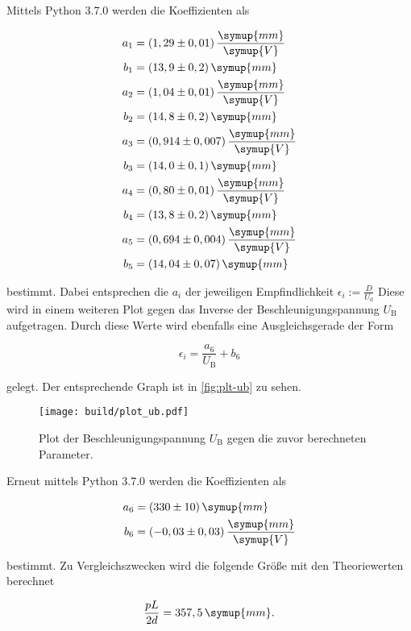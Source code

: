 Mittels Python 3.7.0 werden die Koeffizienten als

\begin{align*}
  a_1 &= (1,29 \pm 0,01) \, \frac{\symup{mm}}{\symup{V}} \\
  b_1 &= (13,9 \pm 0,2) \, \symup{mm} \\
  a_2 &= (1,04 \pm 0,01) \, \frac{\symup{mm}}{\symup{V}} \\
  b_2 &= (14,8 \pm 0,2) \, \symup{mm} \\
  a_3 &= (0,914 \pm 0,007) \, \frac{\symup{mm}}{\symup{V}} \\
  b_3 &= (14,0 \pm 0,1) \, \symup{mm} \\
  a_4 &= (0,80 \pm 0,01) \, \frac{\symup{mm}}{\symup{V}} \\
  b_4 &= (13,8 \pm 0,2) \, \symup{mm} \\
  a_5 &= (0,694 \pm 0,004) \, \frac{\symup{mm}}{\symup{V}} \\
  b_5 &= (14,04 \pm 0,07) \, \symup{mm}
\end{align*}

bestimmt. Dabei entsprechen die $a_i$ der jeweiligen Empfindlichkeit $\epsilon_i := \frac{D}{U_\text{d}}$
Diese wird in einem weiteren Plot gegen das Inverse der Beschleunigungspannung $U_\text{B}$ aufgetragen.
Durch diese Werte wird ebenfalls eine Ausgleichsgerade der Form

\begin{equation}
  \epsilon_i = \frac{a_6}{U_\text{B}} + b_6
\end{equation}

gelegt. Der entsprechende Graph ist in \autoref{fig:plt-ub} zu sehen.

\begin{figure}
  \centering
  \texttt{[image: build/plot\_ub.pdf]}
  \caption{Plot der Beschleunigungspannung $U_\text{B}$ gegen die zuvor berechneten Parameter.}
  \label{fig:plt-ub}
\end{figure}

Erneut mittels Python 3.7.0 werden die Koeffizienten als

\begin{align*}
  a_6 &= (330 \pm 10) \, \symup{mm} \\
  b_6 &= (-0,03 \pm 0,03) \, \frac{\symup{mm}}{\symup{V}}
\end{align*}

bestimmt. Zu Vergleichszwecken wird die folgende Größe mit den Theoriewerten berechnet

\begin{equation}
  \frac{p L}{2 d} = 357,5 \, \symup{mm}.
\end{equation}

